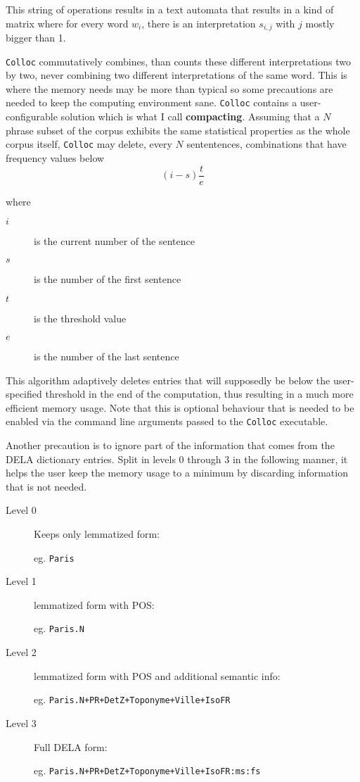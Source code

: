 \documentclass[a4paper,12pt,oneside]{article}
\begin{document}
This string of operations results in a text automata that results in a kind of matrix where for every word $w_i$, there is an interpretation $s_{i,j}$ with $j$ mostly bigger than 1.

\texttt{Colloc} commutatively combines, than counts these different interpretations two by two, never combining two different interpretations of the same word. This is where the memory needs may be more than typical so some precautions are needed to keep the computing environment sane. \texttt{Colloc} contains a user-configurable solution which is what I call \textbf{compacting}. Assuming that a $N$ phrase subset of the corpus exhibits the same statistical properties as the whole corpus itself, \texttt{Colloc} may delete, every $N$ sententences, combinations that have frequency values below $$(i-s)\frac{t}{e}$$

where
\begin{small}
	\begin{description}
		\item[$i$] is the current number of the sentence
		\item[$s$] is the number of the first sentence
		\item[$t$] is the threshold value
		\item[$e$] is the number of the last sentence
	\end{description}
\end{small}

This algorithm adaptively deletes entries that will supposedly be below the user-specified threshold in the end of the computation, thus resulting in a much more efficient memory usage. Note that this is optional behaviour that is needed to be enabled via the command line arguments passed to the \texttt{Colloc} executable.

Another precaution is to ignore part of the information that comes from the DELA dictionary entries. Split in levels 0 through 3 in the following manner, it helps the user keep the memory usage to a minimum by discarding information that is not needed.
	\begin{description}
		\item [Level 0] 
			Keeps only lemmatized form:

		      eg. \texttt{Paris}
		\item [Level 1] lemmatized form with POS:

		      eg. \texttt{Paris.N}
		\item [Level 2] lemmatized form with POS and additional semantic info:

		      eg. \texttt{Paris.N+PR+DetZ+Toponyme+Ville+IsoFR}
		\item [Level 3] Full DELA form:

		      eg. \texttt{Paris.N+PR+DetZ+Toponyme+Ville+IsoFR:ms:fs}
	\end{description}
\end{document}
